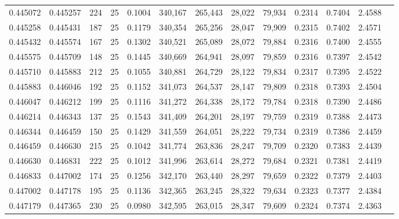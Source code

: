 \begin{tabular}{rrrrrrrrrrrrr}
0.445072 & 0.445257 &   224 &  25 &                                     0.1004 & 340,167 & 265,443 &  28,022 &  79,934 & 0.2314 & 0.7404 & 2.4588 \\
0.445258 & 0.445431 &   187 &  25 &                                     0.1179 & 340,354 & 265,256 &  28,047 &  79,909 & 0.2315 & 0.7402 & 2.4571 \\
0.445432 & 0.445574 &   167 &  25 &                                     0.1302 & 340,521 & 265,089 &  28,072 &  79,884 & 0.2316 & 0.7400 & 2.4555 \\
0.445575 & 0.445709 &   148 &  25 &                                     0.1445 & 340,669 & 264,941 &  28,097 &  79,859 & 0.2316 & 0.7397 & 2.4542 \\
0.445710 & 0.445883 &   212 &  25 &                                     0.1055 & 340,881 & 264,729 &  28,122 &  79,834 & 0.2317 & 0.7395 & 2.4522 \\
0.445883 & 0.446046 &   192 &  25 &                                     0.1152 & 341,073 & 264,537 &  28,147 &  79,809 & 0.2318 & 0.7393 & 2.4504 \\
0.446047 & 0.446212 &   199 &  25 &                                     0.1116 & 341,272 & 264,338 &  28,172 &  79,784 & 0.2318 & 0.7390 & 2.4486 \\
0.446214 & 0.446343 &   137 &  25 &                                     0.1543 & 341,409 & 264,201 &  28,197 &  79,759 & 0.2319 & 0.7388 & 2.4473 \\
0.446344 & 0.446459 &   150 &  25 &                                     0.1429 & 341,559 & 264,051 &  28,222 &  79,734 & 0.2319 & 0.7386 & 2.4459 \\
0.446459 & 0.446630 &   215 &  25 &                                     0.1042 & 341,774 & 263,836 &  28,247 &  79,709 & 0.2320 & 0.7383 & 2.4439 \\
0.446630 & 0.446831 &   222 &  25 &                                     0.1012 & 341,996 & 263,614 &  28,272 &  79,684 & 0.2321 & 0.7381 & 2.4419 \\
0.446833 & 0.447002 &   174 &  25 &                                     0.1256 & 342,170 & 263,440 &  28,297 &  79,659 & 0.2322 & 0.7379 & 2.4403 \\
0.447002 & 0.447178 &   195 &  25 &                                     0.1136 & 342,365 & 263,245 &  28,322 &  79,634 & 0.2323 & 0.7377 & 2.4384 \\
0.447179 & 0.447365 &   230 &  25 &                                     0.0980 & 342,595 & 263,015 &  28,347 &  79,609 & 0.2324 & 0.7374 & 2.4363 \\

\end{tabular}
